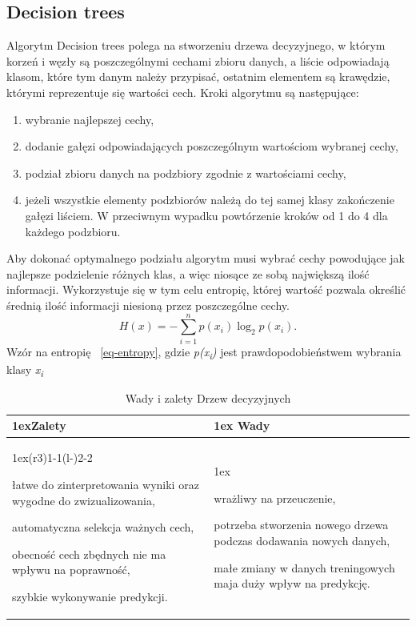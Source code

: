 \subsection{Decision trees}

Algorytm Decision trees polega na stworzeniu drzewa decyzyjnego, w którym korzeń i węzły
są poszczególnymi cechami zbioru danych, a liście odpowiadają klasom, które tym danym 
należy przypisać, ostatnim elementem są krawędzie, którymi reprezentuje się wartości cech. 
Kroki algorytmu są następujące:
\begin{enumerate}
    \item wybranie najlepszej cechy,
    \item dodanie gałęzi odpowiadających poszczególnym wartościom wybranej cechy,
    \item podział zbioru danych na podzbiory zgodnie z wartościami cechy,
    \item jeżeli wszystkie elementy podzbiorów należą do tej samej klasy 
    zakończenie gałęzi liściem. W przeciwnym wypadku powtórzenie kroków 
    od 1 do 4 dla każdego podzbioru.
\end{enumerate}
Aby dokonać optymalnego podziału algorytm musi wybrać cechy powodujące jak najlepsze
podzielenie różnych klas, a więc niosące ze sobą największą ilość informacji.
Wykorzystuje się w tym celu entropię, której wartość pozwala określić średnią ilość 
informacji niesioną przez poszczególne cechy.
\begin{equation}
    H(x)=-\sum_{i=1}^n p(x_i) \log_2 p(x_i).
    \label{eq-entropy}
\end{equation}
Wzór na entropię ~\ref{eq-entropy}, gdzie \textit{p(x\textsubscript{i})} jest prawdopodobieństwem
wybrania klasy \textit{x\textsubscript{i}}
\begin{table}[h]
    \begin{tabularx}{\linewidth}{>{\parskip1ex}X@{\kern4\tabcolsep}>{\parskip1ex}X}
    \toprule
    \hfil\bfseries Zalety
    &
    \hfil\bfseries Wady
    \\\cmidrule(r{3\tabcolsep}){1-1}\cmidrule(l{-\tabcolsep}){2-2}
    
    łatwe do zinterpretowania wyniki oraz wygodne do zwizualizowania,\par
    automatyczna selekcja ważnych cech,\par 
    obecność cech zbędnych nie ma wpływu na poprawność,\par
    szybkie wykonywanie predykcji.\par
    &
    
    wrażliwy na przeuczenie,\par
    potrzeba stworzenia nowego drzewa podczas dodawania nowych danych,\par
    małe zmiany w danych treningowych maja duży wpływ na predykcję.\par
    
    \\\bottomrule
    \end{tabularx}
    \caption{Wady i zalety Drzew decyzyjnych}
\end{table}

